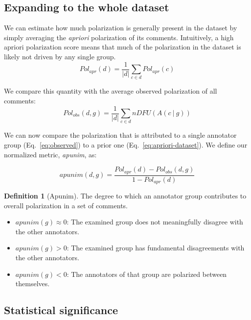 \documentclass[11pt]{article}
\theoremstyle{definition}
\newtheorem{definition}{Definition}
\theoremstyle{plain}
\newcommand\given[1][]{\:#1\vert\:}
\begin{document}
\subsection{Expanding to the whole dataset}
\label{sec:apunim:dataset}

We can estimate how much polarization is generally present in the dataset by simply averaging the \textit{apriori} polarization of its comments. Intuitively, a high apriori polarization score means that much of the polarization in the dataset is likely not driven by any single group.  
\begin{equation}
	\label{eq:apriori-dataset}
	Pol_{apr}(d) = \frac{1}{\lvert d \rvert} \sum_{c \in d} Pol_{apr}(c)
\end{equation}

We compare this quantity with the average observed polarization of all comments:
\begin{equation}
	\label{eq:observed}
	Pol_{obs}(d, g) = \frac{1}{\lvert d \rvert} \sum_{c \in d}  \textit{nDFU}(A(c \given g))
\end{equation}

We can now compare the polarization that is attributed to a single annotator group (Eq.~\ref{eq:observed}) to a prior one (Eq.~\ref{eq:apriori-dataset}). We define our normalized metric, \emph{apunim}, as:

\begin{equation}
	\label{eq:apunim}
	apunim(d, g) = \frac{Pol_{apr}(d) - Pol_{obs}(d, g)}{1 - Pol_{apr}(d)}
\end{equation}

\begin{definition}[Apunim]
	\label{def:apunim}
	The degree to which an annotator group contributes to overall polarization in a set of comments.
\end{definition}

\begin{itemize}
	\item$apunim(g) \approx 0$: The examined group does not meaningfully disagree with the other annotators.
	
	\item $apunim(g) > 0$: The examined group has fundamental disagreements with the other annotators. 
	
	\item $apunim(g) < 0$: The annotators of that group are polarized between themselves.
\end{itemize}


\subsection{Statistical significance}
\label{sec:apunim:statistical}
\end{document}
